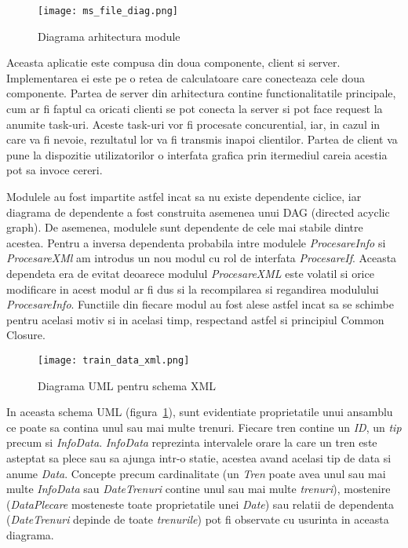 \documentclass[runningheads]{llncs}
\begin{document}
\begin{figure}[htp]
    \centering
    \texttt{[image: ms\_file\_diag.png]}
    \caption{Diagrama arhitectura module}
\end{figure}

Aceasta aplicatie este compusa din doua componente, client si server. Implementarea ei este pe o retea de calculatoare care conecteaza cele doua componente. Partea de server din arhitectura contine functionalitatile principale, cum ar fi faptul ca oricati clienti se pot conecta la server si pot face request la anumite task-uri. Aceste task-uri vor fi procesate concurential, iar, in cazul in care va fi nevoie, rezultatul lor va fi transmis inapoi clientilor. Partea de client va pune la dispozitie utilizatorilor o interfata grafica prin itermediul careia acestia pot sa invoce cereri.

Modulele au fost impartite astfel incat sa nu existe dependente ciclice, iar diagrama de dependente a fost construita asemenea unui DAG (directed acyclic graph). De asemenea, modulele sunt dependente de cele mai stabile dintre acestea. Pentru a inversa dependenta probabila intre modulele \textit{ProcesareInfo} si \textit{ProcesareXMl} am introdus un nou modul cu rol de interfata \textit{ProcesareIf}. Aceasta dependeta era de evitat deoarece modulul \textit{ProcesareXML} este volatil si orice modificare in acest modul ar fi dus si la recompilarea si regandirea modulului \textit{ProcesareInfo}. Functiile din fiecare modul au fost alese astfel incat sa se schimbe pentru acelasi motiv si in acelasi timp, respectand astfel si principiul Common Closure.


\begin{figure}[htp]
    \centering
    \texttt{[image: train\_data\_xml.png]}
    \caption{Diagrama UML pentru schema XML}\label{fig2}
\end{figure}

In aceasta schema UML (figura~\ref{fig2}), sunt evidentiate proprietatile unui ansamblu ce poate sa contina unul sau mai multe trenuri. Fiecare tren contine un \textit{ID}, un \textit{tip} precum si \textit{InfoData}. \textit{InfoData} reprezinta intervalele orare la care un tren este asteptat sa plece sau sa ajunga intr-o statie, acestea avand acelasi tip de data si anume \textit{Data}. Concepte precum cardinalitate (un \textit{Tren} poate avea unul sau mai multe \textit{InfoData} sau \textit{DateTrenuri} contine unul sau mai multe \textit{trenuri}), mostenire (\textit{DataPlecare} mosteneste toate proprietatile unei \textit{Date}) sau relatii de dependenta (\textit{DateTrenuri} depinde de toate \textit{trenurile}) pot fi observate cu usurinta in aceasta diagrama.
\end{document}
